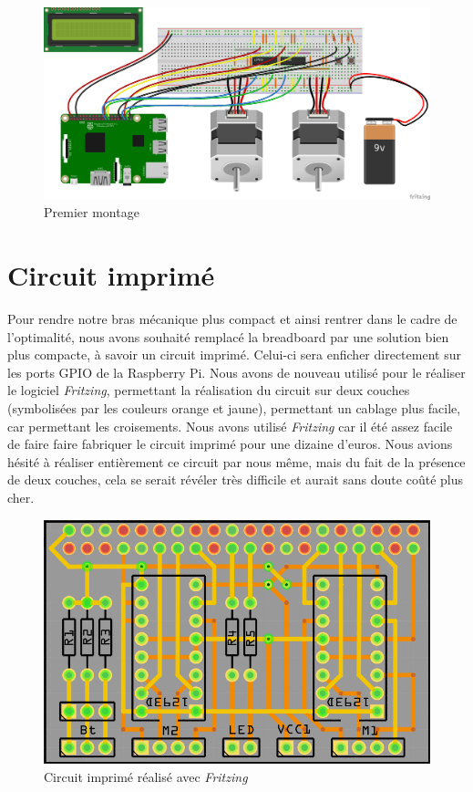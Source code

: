 \documentclass[12pt,a4paper]{report}
\begin{document}
\begin{figure}[!h]
 \center
 \includegraphics[scale=0.45]{../pictures/Sudoku_schema}
 \caption{Premier montage}
\end{figure}

\section{Circuit imprimé}
Pour rendre notre bras mécanique plus compact et ainsi rentrer dans le cadre de l'optimalité, nous avons souhaité remplacé la breadboard par une solution bien plus compacte, à savoir un circuit imprimé. Celui-ci sera enficher directement sur les ports GPIO de la Raspberry Pi. Nous avons de nouveau utilisé pour le réaliser le logiciel \emph{Fritzing}, permettant la réalisation du circuit sur deux couches (symbolisées par les couleurs orange et jaune), permettant un cablage plus facile, car permettant les croisements. Nous avons utilisé \emph{Fritzing} car il été assez facile de faire faire fabriquer le circuit imprimé pour une dizaine d'euros. Nous avions hésité à réaliser entièrement ce circuit par nous même, mais du fait de la présence de deux couches, cela se serait révéler très difficile et aurait sans doute coûté plus cher.

\begin{figure}[!h]
 \center
 \includegraphics[scale=0.5]{../pictures/Sudoku_circuit_imprime.png}
 \caption{Circuit imprimé réalisé avec \emph{Fritzing}}
\end{figure}
\end{document}
